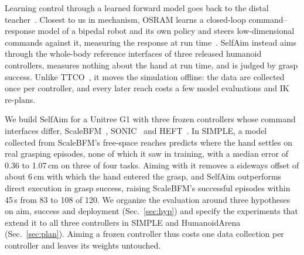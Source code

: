 \documentclass[conference]{IEEEtran}
\begin{document}
Learning control through a learned forward model goes back to the distal teacher~\cite{jordan1992}. Closest to us in mechanism, OSRAM learns a closed-loop command--response model of a bipedal robot and its own policy and steers low-dimensional commands against it, measuring the response at run time~\cite{osram}. SelfAim instead aims through the whole-body reference interfaces of three released humanoid controllers, measures nothing about the hand at run time, and is judged by grasp success. Unlike TTCO~\cite{ttco}, it moves the simulation offline: the data are collected once per controller, and every later reach costs a few model evaluations and IK re-plans.

We build SelfAim for a Unitree G1 with three frozen controllers whose command interfaces differ, ScaleBFM~\cite{scalebfm}, SONIC~\cite{sonic} and HEFT~\cite{heft}. In SIMPLE, a model collected from ScaleBFM's free-space reaches predicts where the hand settles on real grasping episodes, none of which it saw in training, with a median error of 0.36 to 1.07\,cm on three of four tasks. Aiming with it removes a sideways offset of about 6\,cm with which the hand entered the grasp, and SelfAim outperforms direct execution in grasp success, raising ScaleBFM's successful episodes within 45\,s from 83 to 108 of 120. We organize the evaluation around three hypotheses on aim, success and deployment (Sec.~\ref{sec:hyp}) and specify the experiments that extend it to all three controllers in SIMPLE and HumanoidArena~\cite{humanoidarena} (Sec.~\ref{sec:plan}). Aiming a frozen controller thus costs one data collection per controller and leaves its weights untouched.
\end{document}
